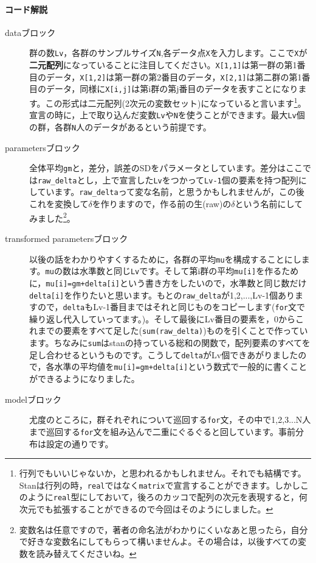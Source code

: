 \documentclass{ltjsbook}
\begin{document}
\paragraph{コード解説}
\begin{description}
	\item[dataブロック] 群の数\verb|Lv|，各群のサンプルサイズ\verb|N|,各データ点\verb|X|を入力します。ここで\verb|X|が\textbf{二元配列}になっていることに注目してください。\verb|X[1,1]|は第一群の第1番目のデータ，\verb|X[1,2]|は第一群の第2番目のデータ，\verb|X[2,1]|は第二群の第1番目のデータ，同様に\verb|X[i,j]|は第i群の第j番目のデータを表すことになります。この形式は二元配列(2次元の変数セット)になっていると言います\footnote{行列でもいいじゃないか，と思われるかもしれません。それでも結構です。Stanは行列の時，\verb|real|ではなく\verb|matrix|で宣言することができます。しかしこのように\verb|real|型にしておいて，後ろのカッコで配列の次元を表現すると，何次元でも拡張することができるので今回はそのようにしました。}。宣言の時に，上で取り込んだ変数\verb|Lv|や\verb|N|を使うことができます。最大\verb|Lv|個の群，各群\verb|N|人のデータがあるという前提です。
	\item[parametersブロック] 全体平均\verb|gm|と，差分，誤差のSDをパラメータとしています。差分はここでは\verb|raw_delta|とし，上で宣言した\verb|Lv|をつかって\verb|Lv-1|個の要素を持つ配列にしています。\verb|raw_delta|って変な名前，と思うかもしれませんが，この後これを変換して$\delta$を作りますので，作る前の生(raw)の$\delta$という名前にしてみました\footnote{変数名は任意ですので，著者の命名法がわかりにくいなあと思ったら，自分で好きな変数名にしてもらって構いませんよ。その場合は，以後すべての変数を読み替えてくださいね。}。
	\item[transformed parametersブロック] 以後の話をわかりやすくするために，各群の平均\verb|mu|を構成することにします。\verb|mu|の数は水準数と同じ\verb|Lv|です。そして第i群の平均\verb|mu[i]|を作るために，\verb|mu[i]=gm+delta[i]|という書き方をしたいので，水準数と同じ数だけ\verb|delta[i]|を作りたいと思います。もとの\verb|raw_delta|が1,2,...,Lv-1個ありますので，\verb|delta|もLv-1番目まではそれと同じものをコピーします(\verb|for|文で繰り返し代入していってます。)。そして最後にLv番目の要素を，0からこれまでの要素をすべて足した(\verb|sum(raw_delta)|)ものを引くことで作っています。ちなみに\verb|sum|はstanの持っている総和の関数で，配列要素のすべてを足し合わせるというものです。こうして\verb|delta|がLv個できあがりましたので，各水準の平均値を\verb|mu[i]=gm+delta[i]|という数式で一般的に書くことができるようになりました。
	\item[modelブロック] 尤度のところに，群それぞれについて巡回する\verb|for|文，その中で1,2,3...N人まで巡回する\verb|for|文を組み込んで二重にぐるぐると回しています。事前分布は設定の通りです。
\end{description}
\end{document}
